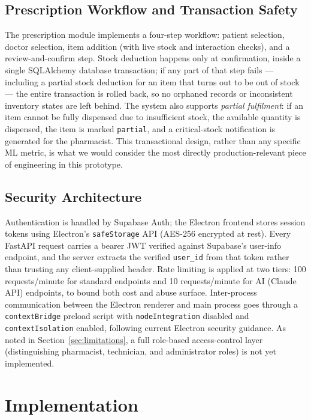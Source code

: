 \documentclass[12pt,a4paper]{article}
\begin{document}
\subsection{Prescription Workflow and Transaction Safety}

The prescription module implements a four-step workflow: patient selection, doctor selection, item addition (with live stock and interaction checks), and a review-and-confirm step. Stock deduction happens only at confirmation, inside a single SQLAlchemy database transaction; if any part of that step fails --- including a partial stock deduction for an item that turns out to be out of stock --- the entire transaction is rolled back, so no orphaned records or inconsistent inventory states are left behind. The system also supports \emph{partial fulfilment}: if an item cannot be fully dispensed due to insufficient stock, the available quantity is dispensed, the item is marked \texttt{partial}, and a critical-stock notification is generated for the pharmacist. This transactional design, rather than any specific ML metric, is what we would consider the most directly production-relevant piece of engineering in this prototype.

\subsection{Security Architecture}

Authentication is handled by Supabase Auth; the Electron frontend stores session tokens using Electron's \texttt{safeStorage} API (AES-256 encrypted at rest). Every FastAPI request carries a bearer JWT verified against Supabase's user-info endpoint, and the server extracts the verified \texttt{user\_id} from that token rather than trusting any client-supplied header. Rate limiting is applied at two tiers: 100 requests/minute for standard endpoints and 10 requests/minute for AI (Claude API) endpoints, to bound both cost and abuse surface. Inter-process communication between the Electron renderer and main process goes through a \texttt{contextBridge} preload script with \texttt{nodeIntegration} disabled and \texttt{contextIsolation} enabled, following current Electron security guidance. As noted in Section~\ref{sec:limitations}, a full role-based access-control layer (distinguishing pharmacist, technician, and administrator roles) is not yet implemented.

\section{Implementation}
\label{sec:implementation}
\end{document}
